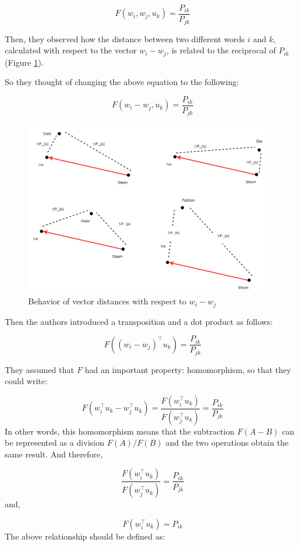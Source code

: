 \[
F(w_i, w_j, u_k) = \frac{P_{ik}}{P_{jk}}
\]

Then, they observed how the distance between two different words $i$ and $k$, calculated with respect to the vector $w_i - w_j$, is related to the reciprocal of $P_{ik}$ (Figure \ref{fig:g6}).

So they thought of changing the above equation to the following:

\[
F(w_i - w_j, u_k) = \frac{P_{ik}}{P_{jk}}
\]

\begin{figure}[h]
    \centering
    \includegraphics[width=0.95\textwidth]{img/g6.PNG}
    \caption{Behavior of vector distances with respect to $w_i - w_j$}
    \label{fig:g6}
\end{figure}

Then the authors introduced a transposition and a dot product as follows:

\[
F((w_i - w_j)^\top u_k) = \frac{P_{ik}}{P_{jk}}
\]

They assumed that $F$ had an important property: homomorphism, so that they could write:

\[
F(w_i^\top u_k - w_j^\top u_k) = \frac{F(w_i^\top u_k)}{F(w_j^\top u_k)} = \frac{P_{ik}}{P_{jk}}
\]
\noindent
In other words, this homomorphism means that the subtraction $F(A-B)$ can be represented as a division $F(A)/F(B)$ and the two operations obtain the same result. And therefore,

\[
\frac{F(w_i^\top u_k)}{F(w_j^\top u_k)} = \frac{P_{ik}}{P_{jk}}
\]
\noindent
and, 

\[
F(w_i^\top u_k) = P_{ik}
\]
\noindent
The above relationship should be defined as:

